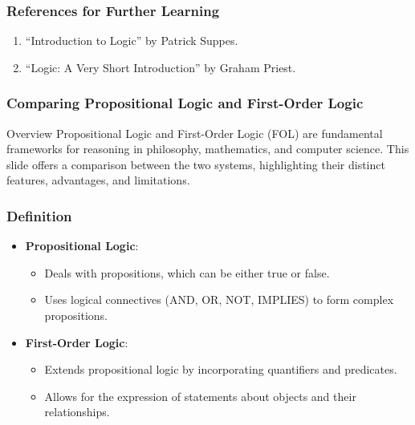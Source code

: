 \documentclass[aspectratio=169]{beamer}
\begin{document}
\begin{frame}[fragile]
    \frametitle{References for Further Learning}
    \begin{enumerate}
        \item ``Introduction to Logic'' by Patrick Suppes.
        \item ``Logic: A Very Short Introduction'' by Graham Priest.
    \end{enumerate}
\end{frame}

\begin{frame}[fragile]
  \frametitle{Comparing Propositional Logic and First-Order Logic}
  \begin{block}{Overview}
    Propositional Logic and First-Order Logic (FOL) are fundamental frameworks for reasoning in philosophy, mathematics, and computer science. 
    This slide offers a comparison between the two systems, highlighting their distinct features, advantages, and limitations.
  \end{block}
\end{frame}

\begin{frame}[fragile]
  \frametitle{Definition}
  \begin{itemize}
    \item \textbf{Propositional Logic}: 
      \begin{itemize}
        \item Deals with propositions, which can be either true or false.
        \item Uses logical connectives (AND, OR, NOT, IMPLIES) to form complex propositions.
      \end{itemize}
    
    \item \textbf{First-Order Logic}: 
      \begin{itemize}
        \item Extends propositional logic by incorporating quantifiers and predicates.
        \item Allows for the expression of statements about objects and their relationships.
      \end{itemize}
  \end{itemize}
\end{frame}
\end{document}
